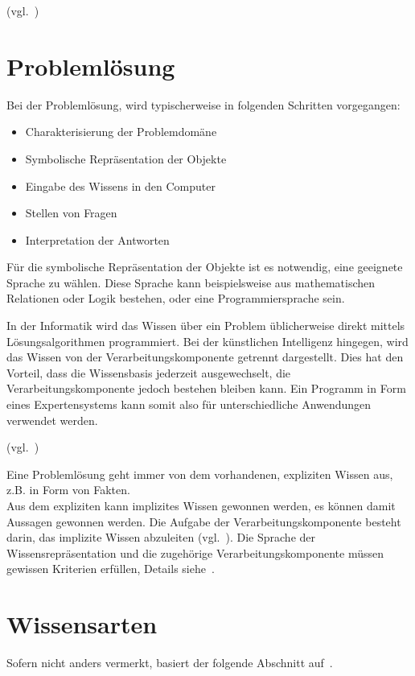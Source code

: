 (vgl.~\cite[S. 23]{laemmel})

\newpage

\section{Problemlösung}
\label{sec:experten_systeme_problemloesung}
Bei der Problemlösung, wird typischerweise in folgenden Schritten vorgegangen:
\begin{itemize}
    \item Charakterisierung der Problemdomäne
    \item Symbolische Repräsentation der Objekte
    \item Eingabe des Wissens in den Computer
    \item Stellen von Fragen
    \item Interpretation der Antworten
\end{itemize}

Für die symbolische Repräsentation der Objekte ist es notwendig, eine geeignete Sprache zu wählen. Diese Sprache kann beispielsweise aus mathematischen Relationen oder Logik bestehen, oder eine Programmiersprache sein.

In der Informatik wird das Wissen über ein Problem üblicherweise direkt mittels Lösungsalgorithmen programmiert. Bei der künstlichen Intelligenz hingegen, wird das Wissen von der Verarbeitungskomponente getrennt dargestellt. Dies hat den Vorteil, dass die Wissensbasis jederzeit ausgewechselt, die Verarbeitungskomponente jedoch bestehen bleiben kann. Ein Programm in Form eines Expertensystems kann somit also für unterschiedliche Anwendungen verwendet werden.

(vgl.~\cite[S. 28 - 30]{laemmel})

Eine Problemlösung geht immer von dem vorhandenen, expliziten Wissen aus, z.B. in Form von Fakten.\\
Aus dem expliziten kann implizites Wissen gewonnen werden, es können damit Aussagen gewonnen werden. Die Aufgabe der Verarbeitungskomponente besteht darin, das implizite Wissen abzuleiten (vgl.~\cite[S. 30 - 31]{laemmel}). Die Sprache der Wissensrepräsentation und die zugehörige Verarbeitungskomponente müssen gewissen Kriterien erfüllen, Details siehe~\cite[S. 31]{laemmel}.

\section{Wissensarten}
\label{sec:experten_systeme_wissensarten}
Sofern nicht anders vermerkt, basiert der folgende Abschnitt auf~\cite[S. 30 - 31]{laemmel}.

